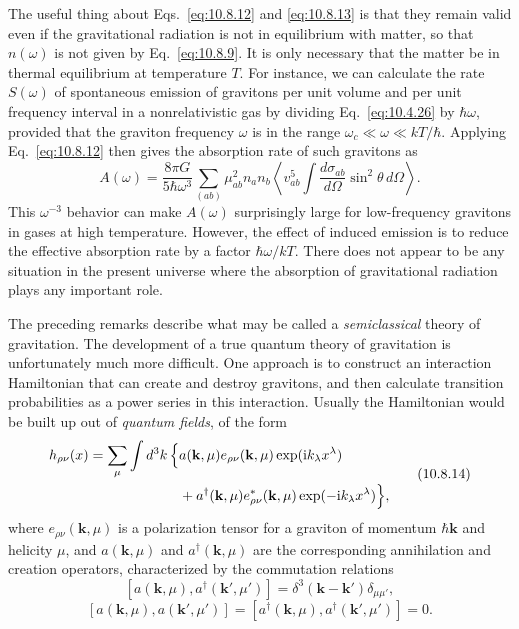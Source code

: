 The useful thing about Eqs.~\eqref{eq:10.8.12} and \eqref{eq:10.8.13} is
that they remain valid even if the gravitational radiation is not in
equilibrium with matter, so that \(n(\omega)\) is not given by
Eq.~\eqref{eq:10.8.9}. It is only necessary that the matter be in thermal
equilibrium at temperature \(T\). For instance, we can calculate the rate
\(S(\omega)\) of spontaneous emission of gravitons per unit volume and per
unit frequency interval in a nonrelativistic gas by dividing
Eq.~\eqref{eq:10.4.26} by \(\hbar\omega\), provided that the graviton
frequency \(\omega\) is in the range
\(\omega_c\ll\omega\ll kT/\hbar\). Applying Eq.~\eqref{eq:10.8.12} then
gives the absorption rate of such gravitons as
\[
  A(\omega)
  =
  \frac{8\pi G}{5\hbar\omega^3}
  \sum_{(ab)}
  \mu_{ab}^2n_an_b
  \left\langle
    v_{ab}^5
    \int
    \frac{d\sigma_{ab}}{d\Omega}
    \sin^2\theta\,d\Omega
  \right\rangle.
\]
This \(\omega^{-3}\) behavior can make \(A(\omega)\) surprisingly large for
low-frequency gravitons in gases at high temperature. However, the effect of
induced emission is to reduce the effective absorption rate by a factor
\(\hbar\omega/kT\). There does not appear to be any situation in the present
universe where the absorption of gravitational radiation plays any important
role.

The preceding remarks describe what may be called a \emph{semiclassical}
theory of gravitation. The development of a true quantum theory of gravitation
is unfortunately much more difficult. One approach is to construct an
interaction Hamiltonian that can create and destroy gravitons, and then
calculate transition probabilities as a power series in this interaction.
Usually the Hamiltonian would be built up out of \emph{quantum fields}, of the
form
\begin{equation}
  \begin{split}
  h_{\rho\nu}(x)
  =
  \sum_\mu\int d^3k\,
  \Bigl\{
    &a(\mathbf{k},\mu)e_{\rho\nu}(\mathbf{k},\mu)
    \exp(\mathrm{i} k_\lambda x^\lambda)
  \\
    &+
    a^\dagger(\mathbf{k},\mu)e_{\rho\nu}^*(\mathbf{k},\mu)
    \exp(-\mathrm{i} k_\lambda x^\lambda)
  \Bigr\},
  \end{split}
  \tag{10.8.14}\label{eq:10.8.14}
\end{equation}
where \(e_{\rho\nu}(\mathbf{k},\mu)\) is a polarization tensor for a graviton
of momentum \(\hbar\mathbf{k}\) and helicity \(\mu\), and
\(a(\mathbf{k},\mu)\) and \(a^\dagger(\mathbf{k},\mu)\) are the
corresponding annihilation and creation operators, characterized by the
commutation relations
\begin{equation}
  \left[
    a(\mathbf{k},\mu),a^\dagger(\mathbf{k}',\mu')
  \right]
  =
  \delta^3(\mathbf{k}-\mathbf{k}')\delta_{\mu\mu'},
  \tag{10.8.15}\label{eq:10.8.15}
\end{equation}
\begin{equation}
  \left[
    a(\mathbf{k},\mu),a(\mathbf{k}',\mu')
  \right]
  =
  \left[
    a^\dagger(\mathbf{k},\mu),a^\dagger(\mathbf{k}',\mu')
  \right]
  =
  0.
  \tag{10.8.16}\label{eq:10.8.16}
\end{equation}

